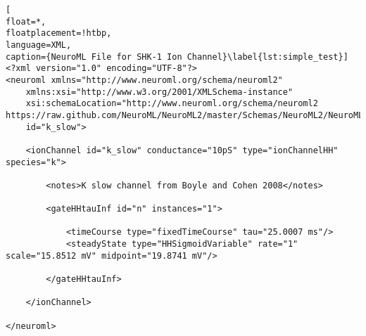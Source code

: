 \documentclass[10pt,a4paper]{article}
\begin{document}
\begin{lstlisting}[
float=*,
floatplacement=!htbp,
language=XML,
caption={NeuroML File for SHK-1 Ion Channel}\label{lst:simple_test}]
<?xml version="1.0" encoding="UTF-8"?>
<neuroml xmlns="http://www.neuroml.org/schema/neuroml2"
    xmlns:xsi="http://www.w3.org/2001/XMLSchema-instance"
    xsi:schemaLocation="http://www.neuroml.org/schema/neuroml2  https://raw.github.com/NeuroML/NeuroML2/master/Schemas/NeuroML2/NeuroML_v2beta.xsd"
    id="k_slow">

    <ionChannel id="k_slow" conductance="10pS" type="ionChannelHH" species="k">

        <notes>K slow channel from Boyle and Cohen 2008</notes>

        <gateHHtauInf id="n" instances="1">

            <timeCourse type="fixedTimeCourse" tau="25.0007 ms"/>
            <steadyState type="HHSigmoidVariable" rate="1" scale="15.8512 mV" midpoint="19.8741 mV"/>
            
        </gateHHtauInf>
        
    </ionChannel>

</neuroml>
\end{lstlisting}
\end{document}
